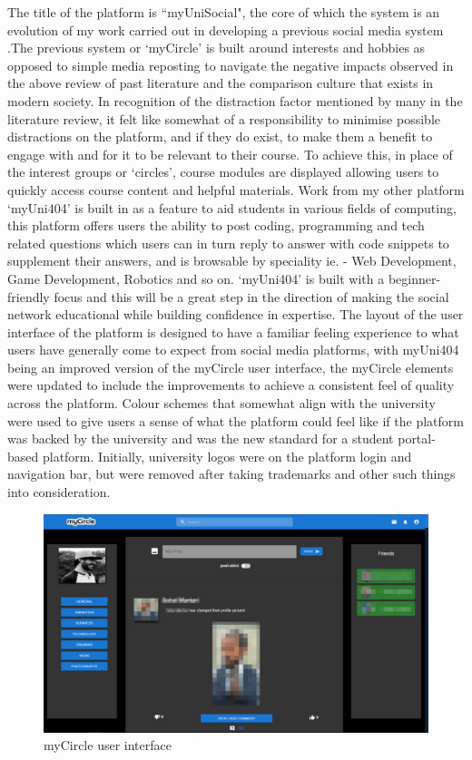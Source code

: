 \documentclass[lettersize,journal]{IEEEtran}
\begin{document}
        The title of the platform is ``myUniSocial", the core of which the system is an evolution of my work carried out in developing a previous
        social media system \cite{Daley 2022}.The previous system or `myCircle'\cite{myCircle} is built around interests and hobbies as opposed
        to simple media reposting to navigate the negative impacts observed in the above review of past literature and the comparison culture that exists in modern
        society. In recognition of the distraction factor mentioned by many in the literature review, it felt like somewhat of a responsibility
        to minimise possible distractions on the platform, and if they do exist, to make them a benefit to engage with and for it to be relevant
        to their course. To achieve this, in place of the interest groups or `circles', course modules are displayed allowing users to
        quickly access course content and helpful materials. Work from my other  platform `myUni404' \cite{myUni404} is built in as a feature to aid students
        in various fields of computing, this platform offers users the ability to post coding, programming and tech related questions which users can in turn reply to answer with code snippets to
	supplement their answers, and is browsable by speciality ie. -  Web Development, Game Development, Robotics and so on. `myUni404' is built with a beginner-friendly focus and this will be
	a great step in the direction of making the social network educational while building confidence in expertise.
	The layout of the user interface of the platform is designed to have a familiar feeling experience to what users have generally come to expect from social media platforms, with myUni404 being an 
	improved version of the myCircle user interface, the myCircle elements were updated to include the improvements to achieve a consistent feel of quality across the platform. 
	Colour schemes that somewhat align with the university were used to give users a sense of what the platform could feel like if the platform was backed by the university and was the new
	standard for a student portal-based platform. Initially, university logos were on the platform login and navigation bar, but were removed after taking trademarks and other such things into
	consideration.

        \begin{figure}[h!]
                \includegraphics[width=\linewidth]{images/myCircle.PNG}
                \caption{myCircle user interface}
                \label{figure 1}
        \end{figure}
	
\end{document}
